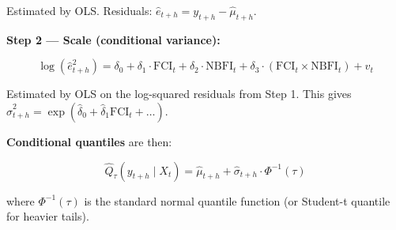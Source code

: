 \documentclass[11pt,a4paper]{article}
\begin{document}
Estimated by OLS. Residuals: $\hat{e}_{t+h} = y_{t+h} - \hat{\mu}_{t+h}$.

\textbf{Step 2 --- Scale (conditional variance):}

\[\log(\hat{e}_{t+h}^2) = \delta_0 + \delta_1 \cdot \text{FCI}_t + \delta_2 \cdot \text{NBFI}_t + \delta_3 \cdot (\text{FCI}_t \times \text{NBFI}_t) + v_t\]

Estimated by OLS on the log-squared residuals from Step 1. This gives $\hat{\sigma}_{t+h}^2 = \exp(\hat{\delta}_0 + \hat{\delta}_1 \text{FCI}_t + \ldots)$.

\textbf{Conditional quantiles} are then:

\[\hat{Q}_\tau(y_{t+h} \mid X_t) = \hat{\mu}_{t+h} + \hat{\sigma}_{t+h} \cdot \Phi^{-1}(\tau)\]

where $\Phi^{-1}(\tau)$ is the standard normal quantile function (or Student-t quantile for heavier tails).
\end{document}
